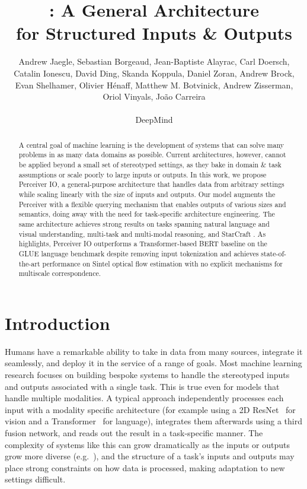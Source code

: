 \documentclass{article} %
\title{\ourmodel: A General Architecture \\for Structured Inputs \& Outputs}
\author{%
  Andrew Jaegle, 
  Sebastian Borgeaud, 
  Jean-Baptiste Alayrac, 
  Carl Doersch,
  Catalin Ionescu,
  \AND
  David Ding, 
  Skanda Koppula,
  Daniel Zoran,
  Andrew Brock, 
  Evan Shelhamer, 
  Olivier H\'{e}naff, 
  \AND
  Matthew M. Botvinick, 
  Andrew Zisserman, 
  Oriol Vinyals, 
  Jo\~{a}o Carreira \\ \\
  DeepMind\\
}
\newcommand{\ourmodel}{Perceiver IO\xspace}
\begin{document}
\maketitle

\begin{abstract}
A central goal of machine learning is the development of systems that can solve many problems in as many data domains as possible. Current architectures, however, cannot be applied beyond a small set of stereotyped settings, as they bake in domain \& task assumptions or scale poorly to large inputs or outputs. In this work, we propose \ourmodel{}, a general-purpose architecture that handles data from arbitrary settings while scaling linearly with the size of inputs and outputs. Our model augments the Perceiver with a flexible querying mechanism that enables outputs of various sizes and semantics, doing away with the need for task-specific architecture engineering.
The same architecture achieves strong results on tasks spanning natural language and visual understanding, multi-task and multi-modal reasoning, and StarCraft . %
As highlights, \ourmodel{} outperforms a Transformer-based BERT baseline on the GLUE language benchmark despite removing input tokenization and achieves state-of-the-art performance on Sintel optical flow estimation with no explicit mechanisms for multiscale correspondence.
\end{abstract}


\section{Introduction}

Humans have a remarkable ability to take in data from many sources, integrate it seamlessly, and deploy it in the service of a range of goals. Most machine learning research focuses on building bespoke systems to handle the stereotyped inputs and outputs associated with a single task. This is true even for models that handle multiple modalities. A typical approach independently processes each input with a modality specific architecture (for example using a 2D ResNet~\citep{he2016deep} for vision and a Transformer~\citep{vaswani2017attention} for language), integrates them afterwards using a third fusion network, and reads out the result in a task-specific manner. The complexity of systems like this can grow dramatically as the inputs or outputs grow more diverse (e.g.~\citealt{abramson2020imitating,vinyals2019grandmaster,ramesh2021zero}), and the structure of a task's inputs and outputs may place strong constraints on how data is processed, making adaptation to new settings difficult.
\end{document}
